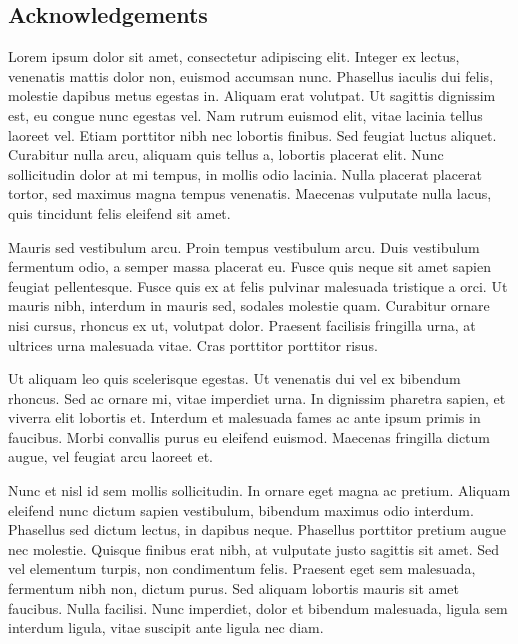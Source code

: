\thispagestyle{empty}
\begin{center}


\section*{Acknowledgements}
\end{center}
 Lorem ipsum dolor sit amet, consectetur adipiscing elit. Integer ex lectus, venenatis mattis dolor non, euismod accumsan nunc. Phasellus iaculis dui felis, molestie dapibus metus egestas in. Aliquam erat volutpat. Ut sagittis dignissim est, eu congue nunc egestas vel. Nam rutrum euismod elit, vitae lacinia tellus laoreet vel. Etiam porttitor nibh nec lobortis finibus. Sed feugiat luctus aliquet. Curabitur nulla arcu, aliquam quis tellus a, lobortis placerat elit. Nunc sollicitudin dolor at mi tempus, in mollis odio lacinia. Nulla placerat placerat tortor, sed maximus magna tempus venenatis. Maecenas vulputate nulla lacus, quis tincidunt felis eleifend sit amet.

Mauris sed vestibulum arcu. Proin tempus vestibulum arcu. Duis vestibulum fermentum odio, a semper massa placerat eu. Fusce quis neque sit amet sapien feugiat pellentesque. Fusce quis ex at felis pulvinar malesuada tristique a orci. Ut mauris nibh, interdum in mauris sed, sodales molestie quam. Curabitur ornare nisi cursus, rhoncus ex ut, volutpat dolor. Praesent facilisis fringilla urna, at ultrices urna malesuada vitae. Cras porttitor porttitor risus.

Ut aliquam leo quis scelerisque egestas. Ut venenatis dui vel ex bibendum rhoncus. Sed ac ornare mi, vitae imperdiet urna. In dignissim pharetra sapien, et viverra elit lobortis et. Interdum et malesuada fames ac ante ipsum primis in faucibus. Morbi convallis purus eu eleifend euismod. Maecenas fringilla dictum augue, vel feugiat arcu laoreet et.

Nunc et nisl id sem mollis sollicitudin. In ornare eget magna ac pretium. Aliquam eleifend nunc dictum sapien vestibulum, bibendum maximus odio interdum. Phasellus sed dictum lectus, in dapibus neque. Phasellus porttitor pretium augue nec molestie. Quisque finibus erat nibh, at vulputate justo sagittis sit amet. Sed vel elementum turpis, non condimentum felis. Praesent eget sem malesuada, fermentum nibh non, dictum purus. Sed aliquam lobortis mauris sit amet faucibus. Nulla facilisi. Nunc imperdiet, dolor et bibendum malesuada, ligula sem interdum ligula, vitae suscipit ante ligula nec diam. 